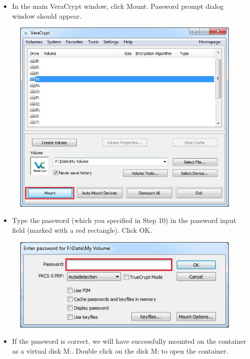 \documentclass{tufte-handout}
\begin{document}
\begin{enumerate}
\begin{itemize}
		\item In the main VeraCrypt window, click Mount. Password prompt dialog window should appear.
	\end{itemize}
	\begin{figure}%
		\includegraphics[width=\linewidth]{img/vc_mount_4.png}
	\end{figure}
	\FloatBarrier
	\begin{itemize}
		\item Type the password (which you specified in Step 10) in the password input field (marked with a red rectangle). Click OK.
	\end{itemize}
	\begin{figure}%
		\includegraphics[width=\linewidth]{img/vc_mount_5.png}
	\end{figure}
	\FloatBarrier
	\begin{itemize}
		\item If the password is correct, we will have successfully mounted on the container as a virtual disk M:. Double click on the disk M: to open the container. 

\end{itemize}
\end{enumerate}
\end{document}
